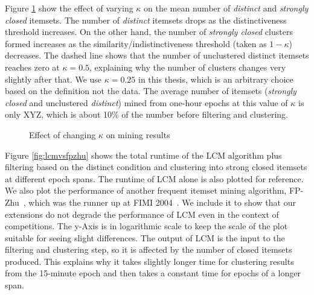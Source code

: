 \documentclass[letterpaper,12pt,titlepage,oneside,final]{book}
\begin{document}

Figure \ref{fig:kappa} show the effect of varying $\kappa$ on the mean number
of \emph{distinct} and \emph{strongly closed} itemsets.
The number of \emph{distinct} itemsets drops as the distinctiveness threshold
increases.
On the other hand, the number of \emph{strongly closed} clusters formed increases
as the similarity/indistinctiveness threshold (taken as $1 - \kappa$) decreases.
The dashed line shows that the number of unclustered distinct itemsets reaches
zero at $\kappa=0.5$, explaining why the number of clusters changes very
slightly after that. 
We use $\kappa = 0.25$ in this thesis, %
which is an arbitrary choice based on the definition not the data.
The average number of itemsets (\emph{strongly closed} and unclustered
\emph{distinct}) mined from one-hour epochs at this value of
$\kappa$ is only XYZ, which is about 10\% of the number before filtering and clustering. %



\begin{figure}
\centering
{}
\caption{Effect of changing $\kappa$ on mining results }
\label{fig:kappa}
\end{figure}


Figure \ref{fig:lcmvsfpzhu} shows the total runtime of the LCM algorithm plus
filtering based on the distinct condition and clustering into strong closed
itemsets at different epoch spans.
The runtime of LCM alone is also plotted for reference.
We also plot the performance of another frequent itemset mining algorithm,
FP-Zhu~\cite{grahne2004reducing}, which was the runner up at
FIMI 2004~\cite{DBLP:conf/fimi/2004}.
We include it to show that our extensions do not degrade the performance of
LCM even in the context of competitions.
The y-Axis is in logarithmic scale to keep the scale of the plot suitable for
seeing slight differences.
The output of LCM is the input to the filtering and clustering step,
so it is affected by the number of closed itemsets produced.
This explains why it takes slightly longer time for clustering results from
the 15-minute epoch and then takes a constant time for epochs of a longer span. 
\end{document}
